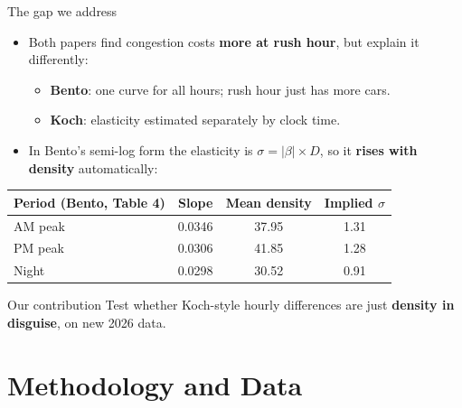 \documentclass[compress]{beamer}
\newcommand{\hl}[1]{{\color{IITRBlue}\textbf{#1}}}
\begin{document}
\begin{frame}[t]{The gap we address}
\begin{itemize}
\item Both papers find congestion costs \hl{more at rush hour}, but explain it differently:
\begin{itemize}
\item \textbf{Bento}: one curve for all hours; rush hour just has more cars.
\item \textbf{Koch}: elasticity estimated separately by clock time.
\end{itemize}
\item In Bento's semi-log form the elasticity is $\sigma = |\beta| \times D$, so it \hl{rises with density} automatically:
\end{itemize}
\begin{center}
\small
\begin{tabular}{lccc}
\toprule
Period (Bento, Table 4) & Slope & Mean density & Implied $\sigma$ \\
\midrule
AM peak & 0.0346 & 37.95 & 1.31 \\
PM peak & 0.0306 & 41.85 & 1.28 \\
Night & 0.0298 & 30.52 & 0.91 \\
\bottomrule
\end{tabular}
\end{center}
\begin{block}{Our contribution}
Test whether Koch-style hourly differences are just \hl{density in disguise}, on new 2026 data.
\end{block}
\end{frame}

\section{Methodology and Data}
\end{document}
